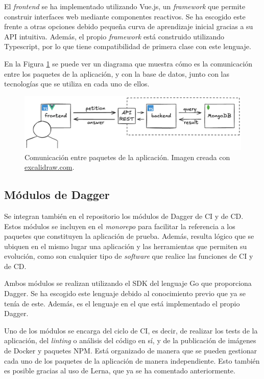 El \textit{frontend} se ha implementado utilizando Vue.js\cite{vue}, un \textit{framework} que permite construir interfaces web mediante componentes reactivos. Se ha escogido este frente a otras opciones debido pequeña curva de aprendizaje inicial gracias a su API intuitiva. Además, el propio \textit{framework} está construido utilizando Typescript, por lo que tiene compatibilidad de primera clase con este lenguaje.

En la Figura \ref{fig:app} se puede ver un diagrama que muestra cómo es la comunicación entre los paquetes de la aplicación, y con la base de datos, junto con las tecnologías que se utiliza en cada uno de ellos.

\begin{figure}
  \centerline{\includegraphics[width=15cm]{figuras/app}}
  \caption{Comunicación entre paquetes de la aplicación. Imagen creada con \href{https://excalidraw.com}{excalidraw.com}.}
  \label{fig:app}
\end{figure}

\subsection*{Módulos de Dagger}

Se integran también en el repositorio los módulos de Dagger de CI y de CD. Estos módulos se incluyen en el \textit{monorepo} para facilitar la referencia a los paquetes que constituyen la aplicación de prueba. Además, resulta lógico que se ubiquen en el mismo lugar una aplicación y las herramientas que permiten su evolución, como son cualquier tipo de \textit{software} que realice las funciones de CI y de CD.

Ambos módulos se realizan utilizando el SDK del lenguaje Go que proporciona Dagger. Se ha escogido este lenguaje debido al conocimiento previo que ya se tenía de este. Además, es el lenguaje en el que está implementado el propio Dagger.

Uno de los módulos se encarga del ciclo de CI, es decir, de realizar los tests de la aplicación, del \textit{linting} o análisis del código en sí, y de la publicación de imágenes de Docker y paquetes NPM. Está organizado de manera que se pueden gestionar cada uno de los paquetes de la aplicación de manera independiente. Esto también es posible gracias al uso de Lerna, que ya se ha comentado anteriormente.


